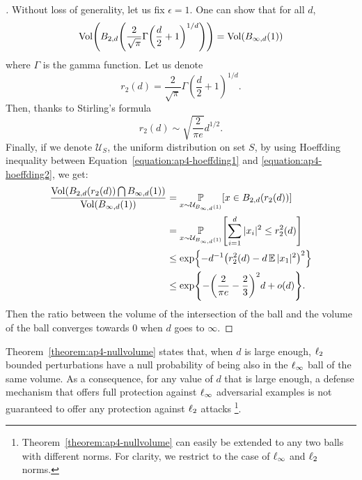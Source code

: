\begin{proof}[] 
Without loss of generality, let us fix $\epsilon = 1$. One can show that for all $d$, 
\begin{equation}
    \Vol\left( B_{2,d}\left(\frac{2}{\sqrt{\pi}}\Gamma\left(\frac{d}{2}+1\right)^{1/d}\right)\right) = \Vol\left(B_{\infty,d}\left(1\right)\right)
\end{equation}
where $\Gamma$ is the gamma function. Let us denote 
\begin{equation}
    r_2(d)=\frac{2}{\sqrt{\pi}}\Gamma\left(\frac{d}{2}+1\right)^{1/d}.
\end{equation}
Then, thanks to Stirling's formula
\begin{equation}
    r_2(d)\sim \sqrt{\frac{2}{\pi e}} d^{1/2}.
\end{equation}
Finally, if we denote $\mathcal{U}_S$, the uniform distribution on set $S$, by using  Hoeffding inequality between Equation~\ref{equation:ap4-hoeffding1} and \ref{equation:ap4-hoeffding2}, we get:
\begin{align}
  \frac{\Vol(B_{2,d}(r_2(d)) \bigcap B_{\infty,d}(1))}{\Vol(B_{\infty,d}(1))} &= \Pbb_{x \sim \mathcal{U}_{B_{\infty,d}(1)}} \left[ x \in B_{2,d}(r_2(d)) \right] \\
  &= \Pbb_{x \sim \mathcal{U}_{B_{\infty,d}(1)}} \left[ \sum_{i=1}^d |x_i|^2 \leq r_2^2(d) \right] \\
  &\leq \exp{- d^{-1} \left( r_2^2(d) - d \Ebb |x_1|^2 \right)^2} \label{equation:ap4-hoeffding1} \\
  &\leq \exp{-\left( \frac{2}{\pi e}-\frac23\right)^2d+o(d)} \label{equation:ap4-hoeffding2}.
\end{align}
Then the ratio between the volume of the intersection of the ball and the volume of the ball converges towards $0$ when $d$ goes to $\infty$.
\end{proof}

Theorem~\ref{theorem:ap4-nullvolume} states that, when $d$ is large enough, $\ell_2 $ bounded perturbations have a null probability of being also in the $\ell_\infty $ ball of the same volume.
As a consequence, for any value of $d$ that is large enough, a defense mechanism that offers full protection against $\ell_\infty $ adversarial examples is not guaranteed to offer any protection against $\ell_2 $ attacks \footnote{Theorem~\ref{theorem:ap4-nullvolume} can easily be extended to any two balls with different norms. For clarity, we restrict to the case of $\ell_\infty $ and $\ell_2 $ norms.}.

